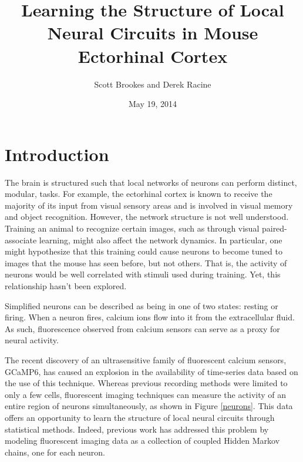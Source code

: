 \documentclass{article}
\begin{document}
\title{Learning the Structure of Local Neural Circuits in Mouse Ectorhinal Cortex}
\author{Scott Brookes and Derek Racine}
\date{May 19, 2014}

\maketitle

\section*{Introduction}
The brain is structured such that local networks of neurons can perform 
distinct, modular, tasks. For example, the ectorhinal cortex is known to 
receive the majority of its input from visual sensory areas and is involved 
in visual memory and object recognition. However, the network structure is 
not well understood. Training an animal to recognize certain images, such as 
through visual paired-associate learning, might also affect the network 
dynamics. In particular, one might hypothesize that this training could cause 
neurons to become tuned to images that the mouse has seen before, but not 
others. That is, the activity of neurons would be well correlated with 
stimuli used during training. Yet, this relationship hasn't been 
explored. \par 

Simplified neurons can be described as being in one of two states: resting or 
firing. When a neuron fires, calcium ions flow into it from the extracellular 
fluid. As such, fluorescence observed from calcium sensors can serve as a 
proxy for neural activity. \par

The recent discovery of an ultrasensitive family of fluorescent calcium 
sensors, GCaMP6, has caused an explosion in the availability of time-series 
data based on the use of this technique.\cite{chen13} Whereas previous 
recording methods were limited to only a few cells, fluorescent imaging 
techniques can measure the activity of an entire region of neurons 
simultaneously, as shown in Figure \ref{neurons}. This data offers 
an opportunity to learn the structure of local neural circuits through 
statistical methods. Indeed, previous work has addressed this problem by 
modeling fluorescent imaging data as a collection of coupled Hidden Markov 
chains, one for each neuron.\cite{mishchenko11} \par
\end{document}
